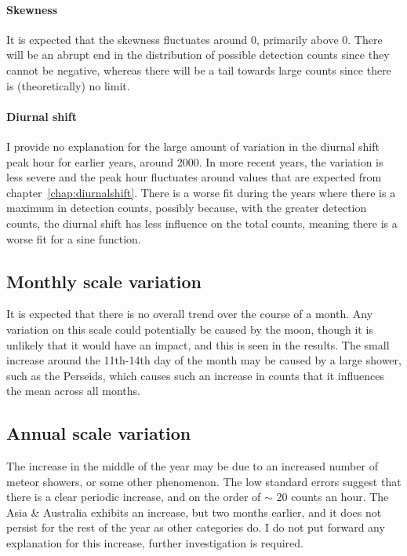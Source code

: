 \paragraph{Skewness\\}
It is expected that the skewness fluctuates around 0, primarily above 0. There will be an abrupt end in the distribution of possible detection counts since they cannot be negative, whereas there will be a tail towards large counts since there is (theoretically) no limit.
\paragraph{Diurnal shift\\}
I provide no explanation for the large amount of variation in the diurnal shift peak hour for earlier years, around 2000. In more recent years, the variation is less severe and the peak hour fluctuates around values that are expected from chapter~\ref{chap:diurnalshift}. There is a worse fit during the years where there is a maximum in detection counts, possibly because, with the greater detection counts, the diurnal shift has less influence on the total counts, meaning there is a worse fit for a sine function.
\subsection{Monthly scale variation}
It is expected that there is no overall trend over the course of a month. Any variation on this scale could potentially be caused by the moon, though it is unlikely that it would have an impact, and this is seen in the results. The small increase around the 11th-14th day of the month may be caused by a large shower, such as the Perseids, which causes such an increase in counts that it influences the mean across all months.
\subsection{Annual scale variation}
The increase in the middle of the year may be due to an increased number of meteor showers, or some other phenomenon. The low standard errors suggest that there is a clear periodic increase, and on the order of $\sim$ 20 counts an hour. The Asia \& Australia exhibits an increase, but two months earlier, and it does not persist for the rest of the year as  other categories do. I do not put forward any explanation for this increase, further investigation is required.
